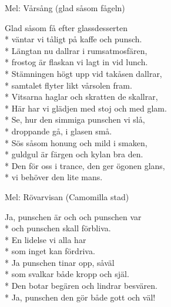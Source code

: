 \begin{SongText}
    \begin{SongInfo}
        Mel: Vårsång (glad såsom fågeln)
    \end{SongInfo}
    \begin{SongVerse}
        Glad såsom få efter glassdesserten\\*%
        väntar vi tåligt på kaffe och punsch.\\*%
        Längtan nu dallrar i rumsatmosfären,\\*%
        frostog är flaskan vi lagt in vid lunch.\\*%
        Stämningen högt upp vid takåsen dallrar,\\*%
        samtalet flyter likt vårsolen fram.\\*%
        Vitsarna haglar och skratten de skallrar,\\*%
        Här har vi glädjen med stoj och med glam.\\*%
        Se, hur den simmiga punschen vi slå,\\*%
        droppande gå, i glasen små.\\*%
        Sös såsom honung och mild i smaken,\\*%
        guldgul är färgen och kylan bra den.\\*%
        Den för oss i trance, den ger ögonen glans,\\*%
        vi behöver den lite mans.
    \end{SongVerse}\end{SongText}
\begin{SongText}
    \begin{SongInfo}
        Mel: Rövarvisan (Camomilla stad)
    \end{SongInfo}
    \begin{SongVerse}
        Ja, punschen är och och punschen var\\*%
        och punschen skall förbliva.\\*%
        En lidelse vi alla har\\*%
        som inget kan fördriva.\\*%
        Ja punschen tinar opp, såväl\\*%
        som svalkar både kropp och själ.\\*%
        Den botar begären och lindrar besvären.\\*%
        Ja, punschen den gör både gott och väl!
    \end{SongVerse}\end{SongText}
